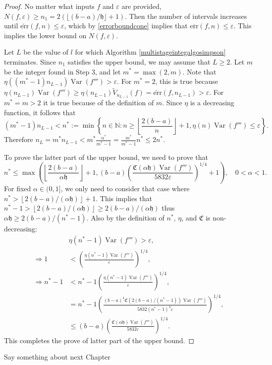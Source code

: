 \documentclass{iitthesis}
\DeclareMathOperator{\Var}{Var}
\theoremstyle{definition}
\theoremstyle{remark}
\begin{document}
\begin{proof}
  No matter what inputs $f$ and $\varepsilon$ are provided, $N(f,\varepsilon)\ge n_1=2(\lfloor (b-a)/\mathfrak{h}\rfloor+1)$. Then the number of intervals increases until $\widetilde{\text{err}}(f,n)\le\varepsilon$, which by \eqref{errorboundcone} implies that $\overline{\text{err}}(f,n)\le\varepsilon$. This implies the lower bound on $N(f,\varepsilon)$.

  Let $L$ be the value of $l$ for which Algorithm \ref{multistageintegalgosimpson} terminates. Since $n_1$ satisfies the upper bound, we may assume that $L \ge 2$. Let $m$ be the integer found in Step 3, and let $m^*=\max(2,m)$. Note that $\eta((m^*-1)n_{L-1})\Var(f''')>\varepsilon$. For $m^*=2$, this is true because $\eta(n_{L-1})\Var(f''')\ge\eta(n_{L-1})\widetilde{V}_{n_{L-1}}(f)=\widetilde{\text{err}}(f,n_{L-1})>\varepsilon$. For $m^*=m>2$ it is true because of the definition of $m$. Since $\eta$ is a decreasing function, it follows that
  $$(m^*-1)n_{L-1}<n^*:=\min\left\{n\in\mathbb{N}:n\ge\left\lfloor\frac{2(b-a)}{n}\right\rfloor+1,\eta(n)\Var(f''')\le\varepsilon\right\}.$$
  Therefore $n_L=m^*n_{L-1}<m^*\frac{n^*}{m^*-1}=\frac{m^*}{m^*-1}n^*\le2n^*$.

  To prove the latter part of the upper bound, we need to prove that
  $$n^*\leq\max\left(\left\lfloor\frac{2(b-a)}{\alpha\mathfrak{h}}\right\rfloor+1,(b-a)\left(\frac{\mathfrak{C}(\alpha\mathfrak{h})\Var(f''')}{5832\varepsilon}\right)^{1/4}+1\right),\quad 0<\alpha<1.$$
  For fixed $\alpha\in(0,1]$, we only need to consider that case where $n^*>\left\lfloor2(b-a)/(\alpha\mathfrak{h})\right\rfloor+1$. This implies that $n^*-1>\left\lfloor2(b-a)/(\alpha\mathfrak{h})\right\rfloor\ge 2(b-a)/(\alpha\mathfrak{h})$ thus $\alpha\mathfrak{h}\ge2(b-a)/(n^*-1)$. Also by the definition of $n^*$, $\eta$, and $\mathfrak{C}$ is non-decreasing:
  \begin{align*}
    &\eta(n^*-1)\Var(f''')>\varepsilon, \\
    \Rightarrow 1&<\left(\frac{\eta(n^*-1)\Var(f''')}{\varepsilon}\right)^{1/4},\\
    \Rightarrow n^*-1&<n^*-1\left(\frac{\eta(n^*-1)\Var(f''')}{\varepsilon}\right)^{1/4},\\
    &=n^*-1\left(\frac{(b-a)^4\mathfrak{C}(2(b-a)/(n^*-1))\Var(f''')}{5832(n^*-1)^4\varepsilon}\right)^{1/4},\\
    &\le(b-a)\left(\frac{\mathfrak{C}(\alpha\mathfrak{h})\Var(f''')}{5832\varepsilon}\right)^{1/4}.
  \end{align*}
  This completes the prove of latter part of the upper bound.
\end{proof}
Say something about next Chapter
\end{document}
